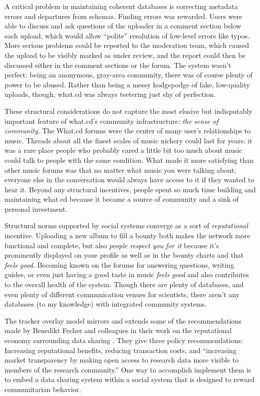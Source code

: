 A critical problem in maintaining coherent databases is correcting
metadata errors and departures from schemas. Finding errors was
rewarded. Users were able to discuss and ask questions of the uploader
in a comment section below each upload, which would allow ``polite''
resolution of low-level errors like typos. More serious problems could
be reported to the moderation team, which caused the upload to be
visibly marked as under review, and the report could then be discussed
either in the comment sections or the forum. The system wasn't perfect:
being an anonymous, gray-area community, there was of course plenty of
power to be abused. Rather than being a messy hodgepodge of fake,
low-quality uploads, though, what.cd was always teetering just shy of
perfection.

These structural considerations do not capture the most elusive but
indisputably important feature of what.cd's community infrastructure:
\emph{the sense of community}. The What.cd forums were the center of
many user's relationships to music. Threads about all the finest scales
of music nichery could last for years: it was a rare place people who
probably cared a little bit too much about music could talk to people
with the same condition. What made it more satisfying than other music
forums was that no matter what music you were talking about, everyone
else in the conversation would always have access to it if they wanted
to hear it. Beyond any structural incentives, people spent so much time
building and maintaining what.cd because it became a source of community
and a sink of personal investment.

Structural norms supported by social systems converge as a sort of
\emph{reputational} incentive. Uploading a new album to fill a bounty
both makes the network more functional and complete, but also
\emph{people respect you for it} because it's prominently displayed on
your profile as well as in the bounty charts and that \emph{feels good}.
Becoming known on the forums for answering questions, writing guides, or
even just having a good taste in music \emph{feels good} and also
contributes to the overall health of the system. Though there are plenty
of databases, and even plenty of different communication venues for
scientists, there aren't any databases (to my knowledge) with integrated
community systems.

The tracker overlay model mirrors and extends some of the
recommendations made by Benedikt Fecher and colleagues in their work on
the reputational economy surrounding data sharing \citep{fecherReputationEconomyHow2017} . They give three policy
recommendations: Increasing reputational benefits, reducing transaction
costs, and ``increasing market transparency by making open access to
research data more visible to members of the research community.'' One
way to accomplish implement them is to embed a data sharing system
within a social system that is designed to reward communitarian
behavior.

